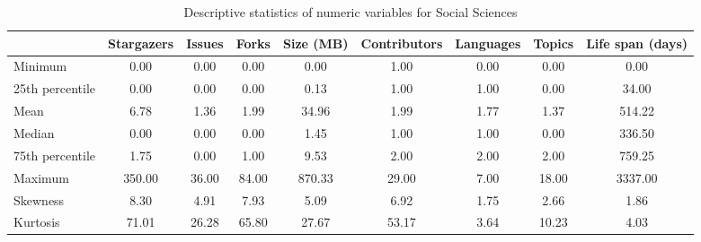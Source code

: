 \begin{table}
\centering
\caption{Descriptive statistics of numeric variables for Social Sciences}
\label{tab:Social_Sciences}
\begin{tabular}{lcccccccc}
\toprule
{} &  Stargazers &  Issues &  Forks &  Size (MB) &  Contributors &  Languages &  Topics &  Life span (days) \\
\midrule
Minimum         &        0.00 &    0.00 &   0.00 &       0.00 &          1.00 &       0.00 &    0.00 &              0.00 \\
25th percentile &        0.00 &    0.00 &   0.00 &       0.13 &          1.00 &       1.00 &    0.00 &             34.00 \\
Mean            &        6.78 &    1.36 &   1.99 &      34.96 &          1.99 &       1.77 &    1.37 &            514.22 \\
Median          &        0.00 &    0.00 &   0.00 &       1.45 &          1.00 &       1.00 &    0.00 &            336.50 \\
75th percentile &        1.75 &    0.00 &   1.00 &       9.53 &          2.00 &       2.00 &    2.00 &            759.25 \\
Maximum         &      350.00 &   36.00 &  84.00 &     870.33 &         29.00 &       7.00 &   18.00 &           3337.00 \\
Skewness        &        8.30 &    4.91 &   7.93 &       5.09 &          6.92 &       1.75 &    2.66 &              1.86 \\
Kurtosis        &       71.01 &   26.28 &  65.80 &      27.67 &         53.17 &       3.64 &   10.23 &              4.03 \\
\bottomrule
\end{tabular}
\end{table}
